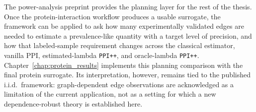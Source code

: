 The power-analysis preprint provides the planning layer for the rest of the thesis. Once the protein-interaction workflow produces a usable surrogate, the framework can be applied to ask how many experimentally validated edges are needed to estimate a prevalence-like quantity with a target level of precision, and how that labeled-sample requirement changes across the classical estimator, vanilla PPI, estimated-lambda \texttt{PPI++}, and oracle-lambda \texttt{PPI++}. Chapter~\ref{chap:protein_results} implements this planning comparison with the final protein surrogate. Its interpretation, however, remains tied to the published i.i.d.\ framework: graph-dependent edge observations are acknowledged as a limitation of the current application, not as a setting for which a new dependence-robust theory is established here.
